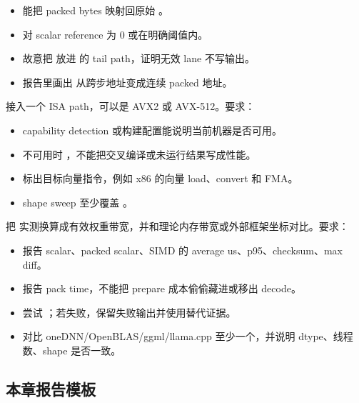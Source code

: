 \begin{itemize}
  \item {} 能把 packed bytes 映射回原始 。
  \item {} 对 scalar reference 为 0 或在明确阈值内。
  \item 故意把  放进  的 tail path，证明无效 lane 不写输出。
  \item 报告里画出  从跨步地址变成连续 packed 地址。
\end{itemize}

 接入一个 ISA path，可以是 AVX2 或 AVX-512。要求：

\begin{itemize}
  \item capability detection 或构建配置能说明当前机器是否可用。
  \item 不可用时 ，不能把交叉编译或未运行结果写成性能。
  \item {} 标出目标向量指令，例如 x86 的向量 load、convert 和 FMA。
  \item shape sweep 至少覆盖 。
\end{itemize}

 把  实测换算成有效权重带宽，并和理论内存带宽或外部框架坐标对比。要求：

\begin{itemize}
  \item 报告 scalar、packed scalar、SIMD 的 average us、p95、checksum、max diff。
  \item 报告 pack time，不能把 prepare 成本偷偷藏进或移出 decode。
  \item 尝试 ；若失败，保留失败输出并使用替代证据。
  \item 对比 oneDNN/OpenBLAS/ggml/llama.cpp 至少一个，并说明 dtype、线程数、shape 是否一致。
\end{itemize}

\subsection{本章报告模板}

